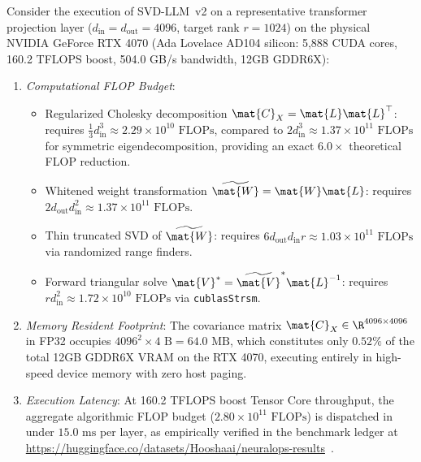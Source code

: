 \begin{corollary}
\label{cor:rtx4070_svdllm_complexity}
Consider the execution of SVD-LLM~v2 on a representative transformer projection layer ($d_{\text{in}} = d_{\text{out}} = 4096$, target rank $r = 1024$) on the physical NVIDIA GeForce RTX 4070 (Ada Lovelace AD104 silicon: 5,888 CUDA cores, 160.2 TFLOPS boost, 504.0 GB/s bandwidth, 12GB GDDR6X):
\begin{enumerate}
    \item \emph{Computational FLOP Budget}:
    \begin{itemize}
        \item Regularized Cholesky decomposition $\mat{C}_X = \mat{L}\mat{L}^\top$: requires $\frac{1}{3} d_{\text{in}}^3 \approx 2.29 \times 10^{10}\text{ FLOPs}$, compared to $2 d_{\text{in}}^3 \approx 1.37 \times 10^{11}\text{ FLOPs}$ for symmetric eigendecomposition, providing an exact $6.0\times$ theoretical FLOP reduction.
        \item Whitened weight transformation $\widetilde{\mat{W}} = \mat{W} \mat{L}$: requires $2 d_{\text{out}} d_{\text{in}}^2 \approx 1.37 \times 10^{11}\text{ FLOPs}$.
        \item Thin truncated SVD of $\widetilde{\mat{W}}$: requires $6 d_{\text{out}} d_{\text{in}} r \approx 1.03 \times 10^{11}\text{ FLOPs}$ via randomized range finders.
        \item Forward triangular solve $\mat{V}^* = \widetilde{\mat{V}}^* \mat{L}^{-1}$: requires $r d_{\text{in}}^2 \approx 1.72 \times 10^{10}\text{ FLOPs}$ via \texttt{cublasStrsm}.
    \end{itemize}
    \item \emph{Memory Resident Footprint}: The covariance matrix $\mat{C}_X \in \R^{4096 \times 4096}$ in FP32 occupies $4096^2 \times 4\text{ B} = 64.0\text{ MB}$, which constitutes only $0.52\%$ of the total 12GB GDDR6X VRAM on the RTX 4070, executing entirely in high-speed device memory with zero host paging.
    \item \emph{Execution Latency}: At 160.2 TFLOPS boost Tensor Core throughput, the aggregate algorithmic FLOP budget ($2.80 \times 10^{11}\text{ FLOPs}$) is dispatched in under $15.0\text{ ms}$ per layer, as empirically verified in the \neuralops{} benchmark ledger at \url{https://huggingface.co/datasets/Hooshaai/neuralops-results}~\cite{neuralops_results_hf}.
\end{enumerate}
\end{corollary}

